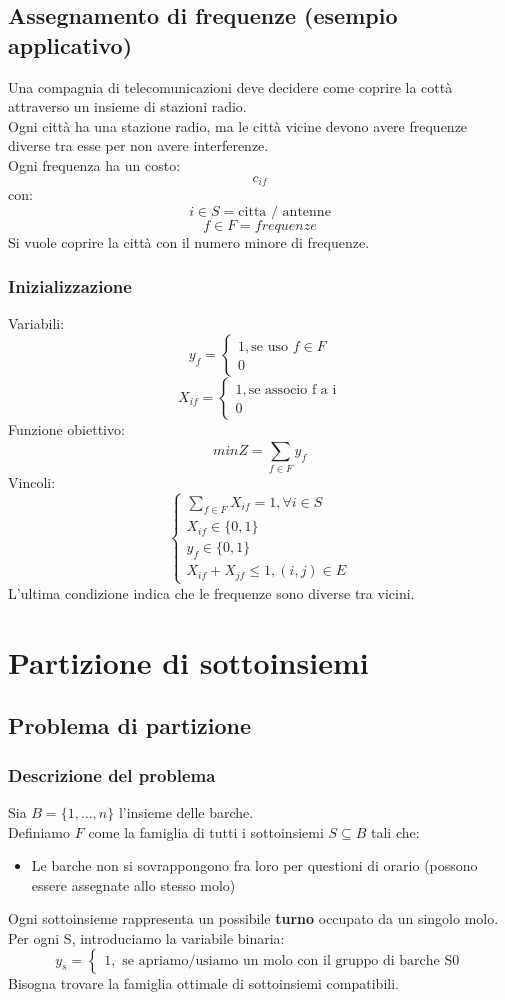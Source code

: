 \documentclass[12pt,a4paper]{article}
\let\oldsection\section
\renewcommand{\section}{\clearpage\oldsection}
\begin{document}
\subsection{Assegnamento di frequenze (esempio applicativo)}
Una compagnia di telecomunicazioni deve decidere come coprire la cottà attraverso un insieme di stazioni radio.\\
Ogni città ha una stazione radio, ma le città vicine devono avere frequenze diverse tra esse per non avere interferenze.\\
Ogni frequenza ha un costo:
\[
c_{if}
\]
con:
\[
i \in S = \text{citta / antenne}
\]
\[
f \in F = frequenze
\]
Si vuole coprire la città con il numero minore di frequenze.
\subsubsection{Inizializzazione}
Variabili:
\[
y_f = \begin{cases}
    1, \text{se uso } f \in F\\
    0 
\end{cases}
\]
\[
X_{if} = \begin{cases}
    1, \text{se associo f a i}\\
    0
\end{cases}
\]
Funzione obiettivo:
\[
minZ = \sum_{f \in F}^{} y_f
\]
Vincoli:
\[
\begin{cases}
    \sum_{f \in F}^{} X_{if} = 1, \forall i \in S\\
    X_{if} \in \{0,1\}\\
    y_f \in \{0,1\}\\
    X_{if} + X_{jf} \leq 1, (i,j) \in E 
\end{cases}
\]
L'ultima condizione indica che le frequenze sono diverse tra vicini.

\section{Partizione di sottoinsiemi}
\subsection{Problema di partizione}
\subsubsection{Descrizione del problema}
Sia $B = \{1,\ldots,n\}$ l'insieme delle barche.\\
Definiamo $F$ come la famiglia di tutti i sottoinsiemi $S \subseteq B$ tali che:
\begin{itemize}
    \item Le barche non si sovrappongono fra loro per questioni di orario (possono essere assegnate allo stesso molo)
\end{itemize}
Ogni sottoinsieme rappresenta un possibile \textbf{turno} occupato da un singolo molo.\\
Per ogni S, introduciamo la variabile binaria:
\[
y_s = \begin{cases}
    1, \text{ se apriamo/usiamo un molo con il gruppo di barche S}
    0
\end{cases}
\]
Bisogna trovare la famiglia ottimale di sottoinsiemi compatibili.
\end{document}
